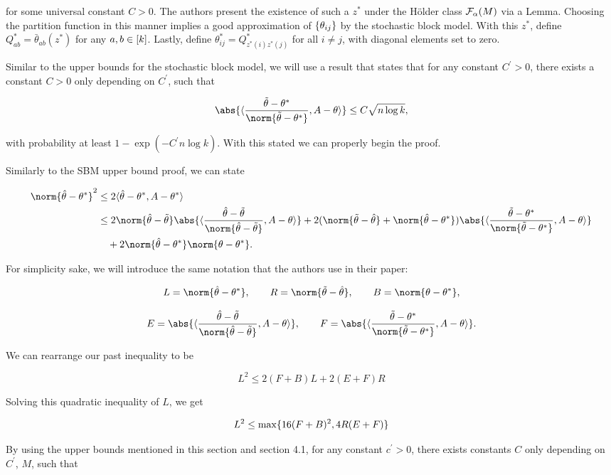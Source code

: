 \documentclass[11pt]{article}
\begin{document}
for some universal constant $C >0$. The authors present the existence of such a $z^\ast$ under the H\"older class $\mathcal{F}_{\alpha}(M)$ via a Lemma. Choosing the partition function in this manner implies a good approximation of $\{\theta_{ij}\}$ by the stochastic block model. With this $z^\ast$, define $Q^\ast_{ab} = \bar{\theta}_{ab}(z^\ast)$ for any $a,b \in \lbrack k\rbrack$. Lastly, define $\theta^\ast_{ij} = Q^\ast_{z^\ast(i)z^\ast(j)}$ for all $i \neq j$, with diagonal elements set to zero.

Similar to the upper bounds for the stochastic block model, we will use a result that states that for any constant $C^\prime > 0$, there exists a constant $C>0$ only depending on $C^\prime$, such that

\[  \abs{\dprod{\frac{\ttheta - \atheta}{\norm{\ttheta-\atheta}}, A-\theta}} \leq C\sqrt{n\log k},  \]

with probability at least $1-\exp(-C^\prime n \log k)$. With this stated we can properly begin the proof.

Similarly to the SBM upper bound proof, we can state

\begin{align*}
    \norm{\htheta - \atheta}^2 & \leq 2\dprod{\htheta - \atheta, A - \atheta} \\
    & \leq 2\norm{\htheta - \ttheta}\abs{\dprod{\frac{\htheta-\ttheta}{\norm{\htheta-\ttheta}},A-\theta}} + 2(\norm{\ttheta-\htheta} + \norm{\htheta-\atheta})\abs{\dprod{\frac{\ttheta-\atheta}{\norm{\ttheta-\atheta}},A-\theta}} \\
    & \quad + 2\norm{\htheta-\atheta}\norm{\theta-\atheta}.
\end{align*}

For simplicity sake, we will introduce the same notation that the authors use in their paper:

\[ L = \norm{\htheta-\atheta}, \qquad R = \norm{\ttheta-\htheta}, \qquad B = \norm{\theta - \atheta},  \]

\[ E = \abs{\dprod{\frac{\htheta-\ttheta}{\norm{\htheta-\ttheta}},A-\theta}}, \qquad F = \abs{\dprod{\frac{\ttheta-\atheta}{\norm{\ttheta-\atheta}},A-\theta}}.  \]

We can rearrange our past inequality to be

\[ L^2 \leq 2(F+B)L + 2(E+F)R   \]

Solving this quadratic inequality of $L$, we get

\[ L^2 \leq \max\{16(F+B)^2, 4R(E+F)\}  \]

By using the upper bounds mentioned in this section and section 4.1, for any constant $c^\prime >0$, there exists constants $C$ only depending on $C^\prime$, $M$, such that
\end{document}
